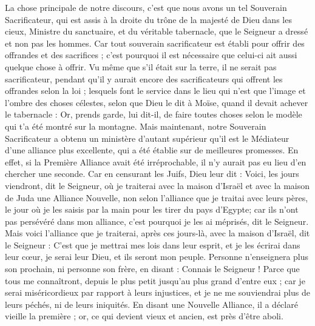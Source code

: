 \begin{multicols}{2}
\VerseOne{}La chose principale de notre discours, c'est que nous avons un tel Souverain Sacrificateur, qui est assis à la droite du trône de la majesté de Dieu dans les cieux,
Ministre du sanctuaire, et du véritable tabernacle, que le Seigneur a dressé et non pas les hommes.
Car tout souverain sacrificateur est établi pour offrir des offrandes et des sacrifices ; c'est pourquoi il est nécessaire que celui-ci ait aussi quelque chose à offrir.
Vu même que s'il était sur la terre, il ne serait pas sacrificateur, pendant qu'il y aurait encore des sacrificateurs qui offrent les offrandes selon la loi ;
lesquels font le service dans le lieu qui n'est que l'image et l'ombre des choses célestes, selon que Dieu le dit à Moïse, quand il devait achever le tabernacle : Or, prends garde, lui dit-il, de faire toutes choses selon le modèle qui t'a été montré sur la montagne.
Mais maintenant, notre Souverain Sacrificateur a obtenu un ministère d'autant supérieur qu'il est le Médiateur d'une alliance plus excellente, qui a été établie sur de meilleures promesses.
En effet, si la Première Alliance avait été irréprochable, il n'y aurait pas eu lieu d'en chercher une seconde.
Car en censurant les Juifs, Dieu leur dit : Voici, les jours viendront, dit le Seigneur, où je traiterai avec la maison d'Israël et avec la maison de Juda une Alliance Nouvelle,
non selon l'alliance que je traitai avec leurs pères, le jour où je les saisis par la main pour les tirer du pays d'Egypte; car ils n'ont pas persévéré dans mon alliance, c'est pourquoi je les ai méprisés, dit le Seigneur.
Mais voici l'alliance que je traiterai, après ces jours-là, avec la maison d'Israël, dit le Seigneur : C'est que je mettrai mes lois dans leur esprit, et je les écrirai dans leur cœur, je serai leur Dieu, et ils seront mon peuple.
Personne n'enseignera plus son prochain, ni personne son frère, en disant : Connais le Seigneur ! Parce que tous me connaîtront, depuis le plus petit jusqu'au plus grand d'entre eux ;
car je serai miséricordieux par rapport à leurs injustices, et je ne me souviendrai plus de leurs péchés, ni de leurs iniquités.
En disant une Nouvelle Alliance, il a déclaré vieille la première ; or, ce qui devient vieux et ancien, est près d'être aboli.

\end{multicols}
